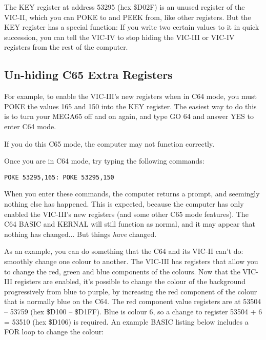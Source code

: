 
The KEY register at address 53295 (hex \$D02F) is an unused register of the VIC-II, which you can POKE to and
PEEK from, like other registers.  But the KEY register has a special function: If
you write two certain values to it in quick succession, you can tell the VIC-IV
to stop hiding the VIC-III or VIC-IV registers from the rest of the computer.

\subsection{Un-hiding C65 Extra Registers}

For example, to enable the VIC-III's new registers when in C64 mode, you must POKE the values 165 and 150
into the KEY register. The easiest way to do this is to turn your MEGA65 off and on again, and type GO 64
and answer YES to enter C64 mode.

If you do this C65 mode, the computer may not function correctly.

Once you are in C64 mode, try typing the following commands:

\begin{tcolorbox}[colback=black,coltext=white]
\verbatimfont{\codefont}
\begin{verbatim}
POKE 53295,165: POKE 53295,150
\end{verbatim}
\end{tcolorbox}

When you enter these commands, the computer returns a  prompt, and seemingly nothing else has
happened.  This is expected, because the computer has only enabled the VIC-III's new registers (and some other
C65 mode features). The C64 BASIC and KERNAL will still function as normal, and it may appear
that nothing has changed... But things \textit{have} changed.

As an example, you can do something that the C64 and its VIC-II can't do: smoothly change one colour to another.
The VIC-III has registers that allow you to change the red, green and blue components of the colours. Now that the VIC-III
registers are enabled, it's possible to change the colour of the background progressively from blue to purple, by increasing
the red component of the colour that is normally blue on the C64.  The red component value registers are at
53504 -- 53759 (hex \$D100 -- \$D1FF). Blue is colour 6, so a change to register 53504 + 6 = 53510 (hex \$D106) is required.
An example BASIC listing below includes a FOR loop to change the colour:

